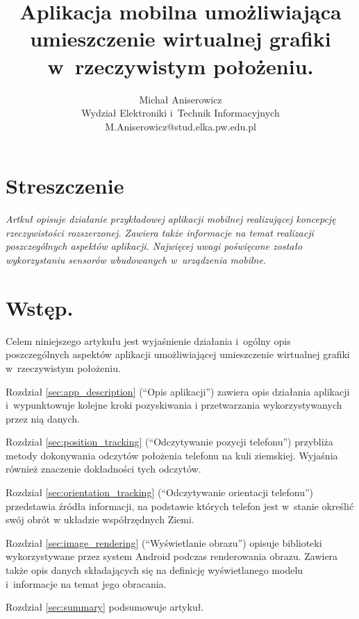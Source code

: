 \documentclass[a4paper,twocolumn,11pt]{article}
\title{{\mycfsb{14} Aplikacja mobilna umożliwiająca umieszczenie wirtualnej grafiki w~rzeczywistym położeniu.}}
\author{{\mycfs{12} Michał Aniserowicz} \\ {\mycfs{11} Wydział Elektroniki i~Technik Informacyjnych} \\ {\mycfs{11} M.Aniserowicz@stud.elka.pw.edu.pl}}
\date{}
\begin{document}
\vspace{1.5cm}

\maketitle




\section*{Streszczenie}

\emph{
 Artkuł opisuje działanie przykładowej aplikacji mobilnej realizującej koncepcję rzeczywistości rozszerzonej.
 Zawiera także informacje na temat realizacji poszczególnych aspektów aplikacji.
 Najwięcej uwagi poświęcone zostało wykorzystaniu sensorów wbudowanych w~urządzenia mobilne.
}




\section{Wstęp.}

Celem niniejszego artykułu jest wyjaśnienie działania i~ogólny opis poszczególnych aspektów aplikacji umożliwiającej umieszczenie wirtualnej grafiki w~rzeczywistym położeniu.

Rozdział \ref{sec:app_description} (``Opis aplikacji'') zawiera opis działania aplikacji i~wypunktowuje kolejne kroki pozyskiwania i przetwarzania wykorzystywanych przez nią danych.

Rozdział \ref{sec:position_tracking} (``Odczytywanie pozycji telefonu'') przybliża metody dokonywania odczytów położenia telefonu na kuli ziemskiej.
Wyjaśnia również znaczenie dokładności tych odczytów.

Rozdział \ref{sec:orientation_tracking} (``Odczytywanie orientacji telefonu'') przedstawia źródła informacji, na podstawie których telefon jest w~stanie określić swój obrót w układzie współrzędnych Ziemi.

Rozdział \ref{sec:image_rendering} (``Wyświetlanie obrazu'') opisuje biblioteki wykorzystywane przez system Android podczas renderowania obrazu. Zawiera także opis danych składających się na definicję wyświetlanego modelu i~informacje na temat jego obracania.

Rozdział \ref{sec:summary} podsumowuje artykuł.
\end{document}
